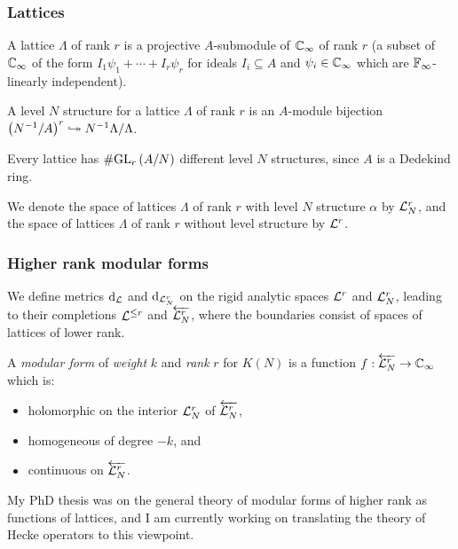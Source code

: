 \begin{frame} \frametitle{Lattices}
  \begin{definition}
    A lattice $\Lambda$ of rank $r$ is a projective $A$-submodule of $\CC_\infty$ of rank $r$ \pause (\ie a subset of $\CC_\infty$ of the form $I_1\psi_1 +\dotsb +I_r\psi_r$ for ideals $I_i \subseteq A$ and $\psi_i \in \CC_\infty$ which are $\FF_\infty$-linearly independent). \pause

    A level $N$ structure for a lattice $\Lambda$ of rank $r$ is an $A$-module bijection $\parens{N^{-1}/A}^r \ionto N^{-1}\Lambda/\Lambda$.
  \end{definition} \pause

  Every lattice has $\size{\GL[r]{A/N}}$ different level $N$ structures, since $A$ is a Dedekind ring.

  We denote the space of lattices $\Lambda$ of rank $r$ with level $N$ structure $\alpha$ by $\LL_N^r$, and the space of lattices $\Lambda$ of rank $r$ without level structure by $\LL^r$. \pause
\end{frame}


\begin{frame} \frametitle{Higher rank modular forms}
  We define metrics $\dd_\LL$ and $\dd_{\LL_N^r}$ on the rigid analytic spaces $\LL^r$ and $\LL_N^r$, leading to their completions $\LL^{\leq r}$ and $\LLNRi$, where the boundaries consist of spaces of lattices of lower rank. \pause
  \begin{definition} \label{def:strongMForm}
    A \emph{modular form} of \emph{weight} $k$ and \emph{rank} $r$ for $K(N)$ is a function $f : \LLNRi \to \CCi$ which is: \pause
    \begin{itemize}
      \item holomorphic on the interior $\LL_N^r$ of $\LLNRi$\pause,
      \item homogeneous of degree $-k$\pause, and
      \item continuous on $\LLNRi$. \pause
    \end{itemize}
  \end{definition}


  My PhD thesis was on the general theory of modular forms of higher rank as functions of lattices, and I am currently working on translating the theory of Hecke operators to this viewpoint.
\end{frame}


